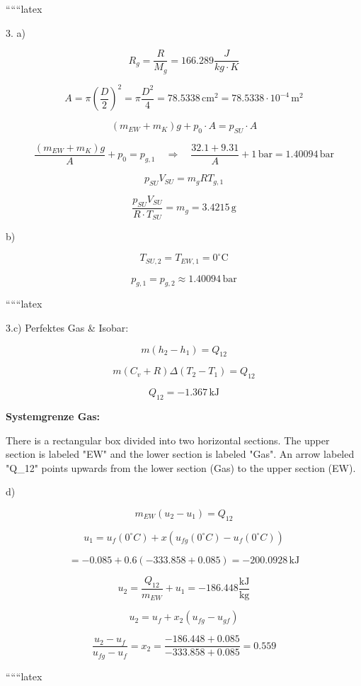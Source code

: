 
``````latex


3. a)

\[
R_g = \frac{R}{M_g} = 166.289 \frac{J}{kg \cdot K}
\]

\[
A = \pi \left( \frac{D}{2} \right)^2 = \pi \frac{D^2}{4} = 78.5338 \, \text{cm}^2 = 78.5338 \cdot 10^{-4} \, \text{m}^2
\]


\[
(m_{EW} + m_K) g + p_0 \cdot A = p_{SU} \cdot A
\]

\[
\frac{(m_{EW} + m_K) g}{A} + p_0 = p_{g,1} \quad \Rightarrow \quad \frac{32.1 + 9.31}{A} + 1 \, \text{bar} = 1.40094 \, \text{bar}
\]


\[
p_{SU} V_{SU} = m_g R T_{g,1}
\]

\[
\frac{p_{SU} V_{SU}}{R \cdot T_{SU}} = m_g = 3.4215 \, \text{g}
\]

b)

\[
T_{SU,2} = T_{EW,1} = 0^\circ \text{C}
\]

\[
p_{g,1} = p_{g,2} \approx 1.40094 \, \text{bar}
\]



``````latex


3.c) Perfektes Gas \& Isobar:

\[
m(h_2 - h_1) = Q_{12}
\]

\[
m(C_v + R) \Delta (T_2 - T_1) = Q_{12}
\]

\[
Q_{12} = -1.367 \, \text{kJ}
\]

\textbf{Systemgrenze Gas:}

There is a rectangular box divided into two horizontal sections. The upper section is labeled "EW" and the lower section is labeled "Gas". An arrow labeled "Q_{12}" points upwards from the lower section (Gas) to the upper section (EW).

d) 

\[
m_{EW} (u_2 - u_1) = Q_{12}
\]

\[
u_1 = u_f(0^\circ C) + x (u_{fg}(0^\circ C) - u_f(0^\circ C))
\]

\[
= -0.085 + 0.6 (-333.858 + 0.085) = -200.0928 \, \text{kJ}
\]

\[
u_2 = \frac{Q_{12}}{m_{EW}} + u_1 = -186.448 \frac{\text{kJ}}{\text{kg}}
\]

\[
u_2 = u_f + x_2 (u_{fg} - u_{gf})
\]

\[
\frac{u_2 - u_f}{u_{fg} - u_f} = x_2 = \frac{-186.448 + 0.085}{-333.858 + 0.085} = 0.559
\]

``````latex


